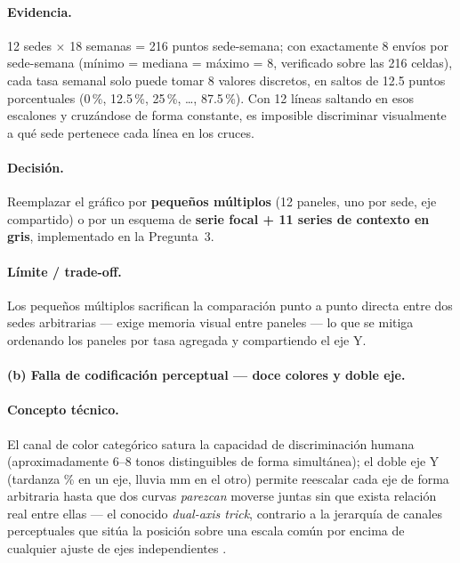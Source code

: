 \paragraph{Evidencia.} 12 sedes $\times$ 18 semanas = 216 puntos sede-semana; con exactamente 8 envíos por sede-semana (mínimo = mediana = máximo = 8, verificado sobre las 216 celdas), cada tasa semanal solo puede tomar 8 valores discretos, en saltos de 12.5 puntos porcentuales (0\,\%, 12.5\,\%, 25\,\%, \ldots, 87.5\,\%). Con 12 líneas saltando en esos escalones y cruzándose de forma constante, es imposible discriminar visualmente a qué sede pertenece cada línea en los cruces.

\paragraph{Decisión.} Reemplazar el gráfico por \textbf{pequeños múltiplos} (12 paneles, uno por sede, eje compartido) o por un esquema de \textbf{serie focal + 11 series de contexto en gris}, implementado en la Pregunta~3.

\paragraph{Límite / trade-off.} Los pequeños múltiplos sacrifican la comparación punto a punto directa entre dos sedes arbitrarias --- exige memoria visual entre paneles --- lo que se mitiga ordenando los paneles por tasa agregada y compartiendo el eje Y.

\paragraph{(b) Falla de codificación perceptual --- doce colores y doble eje.}

\paragraph{Concepto técnico.} El canal de color categórico satura la capacidad de discriminación humana (aproximadamente 6--8 tonos distinguibles de forma simultánea); el doble eje Y (tardanza \% en un eje, lluvia mm en el otro) permite reescalar cada eje de forma arbitraria hasta que dos curvas \emph{parezcan} moverse juntas sin que exista relación real entre ellas --- el conocido \emph{dual-axis trick}, contrario a la jerarquía de canales perceptuales que sitúa la posición sobre una escala común por encima de cualquier ajuste de ejes independientes \citep{cleveland1984graphical}.

